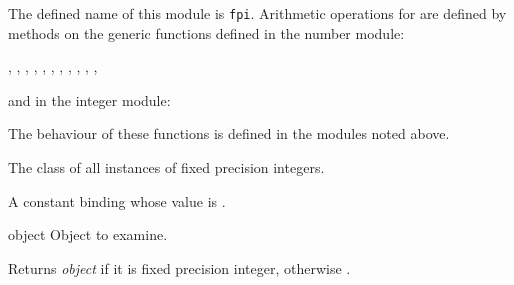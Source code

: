 \label{fpi}
\label{spint}
\begin{optDefinition}

    The defined name of this module is {\tt fpi}.  Arithmetic operations for
     are defined by methods on the generic
    functions defined in the number module:
%
\begin{flushleft}
    ,
    ,
    ,
    ,
    ,
    ,
    ,
    ,
    ,
    ,
    ,
\end{flushleft}

\noindent
and in the integer module:
\begin{flushleft}
\end{flushleft}

\noindent
The behaviour of these functions is defined in the modules noted
above.


The class of all instances of fixed precision integers.


\remarks%
A constant binding whose value is .

\begin{arguments}
\item[object] Object to examine.
\end{arguments}

\result%
Returns {\em object\/} if it is fixed precision integer, otherwise
\nil.


\end{optDefinition}
